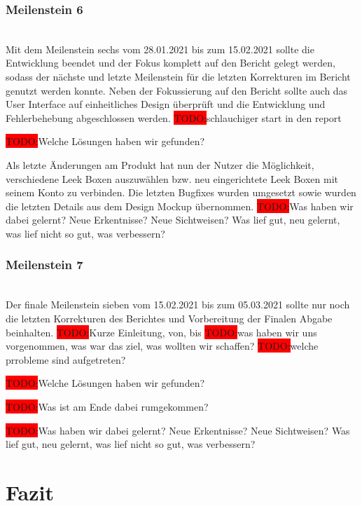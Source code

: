 \documentclass[10pt, a4paper]{article}
\begin{document}
\subsubsection*{Meilenstein 6} $~$ \\
Mit dem Meilenstein sechs vom 28.01.2021 bis zum 15.02.2021 sollte die Entwicklung beendet und der Fokus komplett auf den Bericht gelegt werden, sodass der nächste und letzte Meilenstein für die letzten Korrekturen im Bericht genutzt werden konnte.
Neben der Fokussierung auf den Bericht sollte auch das User Interface auf einheitliches Design überprüft und die Entwicklung und Fehlerbehebung abgeschlossen werden.
\colorbox{red}{TODO:}schlauchiger start in den report

\colorbox{red}{TODO:}Welche Lösungen haben wir gefunden?

Als letzte Änderungen am Produkt hat nun der Nutzer die Möglichkeit, verschiedene Leek Boxen auszuwählen bzw. neu eingerichtete Leek Boxen mit seinem Konto zu verbinden.
Die letzten Bugfixes wurden umgesetzt sowie wurden die letzten Details aus dem Design Mockup übernommen.
\colorbox{red}{TODO:}Was haben wir dabei gelernt? Neue Erkentnisse? Neue Sichtweisen?
Was lief gut, neu gelernt, was lief nicht so gut, was verbessern?

\subsubsection*{Meilenstein 7} $~$ \\
Der finale Meilenstein sieben vom 15.02.2021 bis zum 05.03.2021 sollte nur noch die letzten Korrekturen des Berichtes und Vorbereitung der Finalen Abgabe beinhalten.
\colorbox{red}{TODO:}Kurze Einleitung, von, bis
\colorbox{red}{TODO:}was haben wir uns vorgenommen, was war das ziel, was wollten wir schaffen?
\colorbox{red}{TODO:}welche prrobleme sind aufgetreten?

\colorbox{red}{TODO:}Welche Lösungen haben wir gefunden?

\colorbox{red}{TODO:}Was ist am Ende dabei rumgekommen?

\colorbox{red}{TODO:}Was haben wir dabei gelernt? Neue Erkentnisse? Neue Sichtweisen?
Was lief gut, neu gelernt, was lief nicht so gut, was verbessern?


\section{Fazit}
\end{document}
